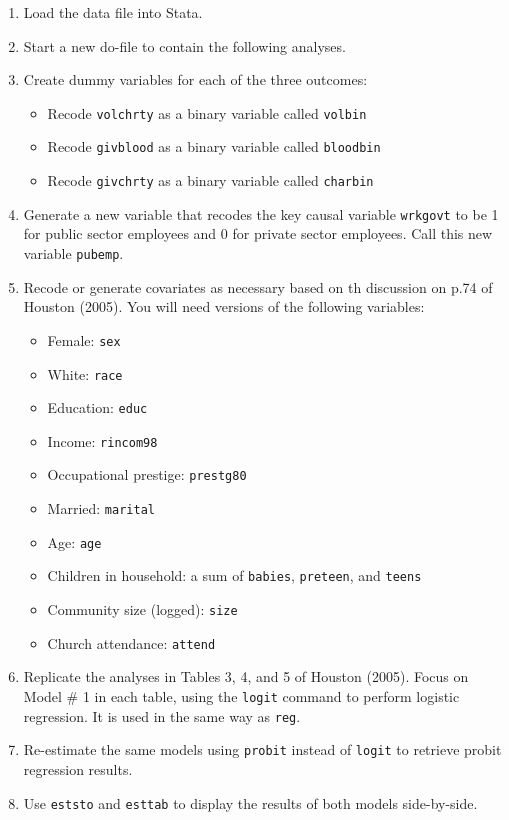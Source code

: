 \documentclass[a4paper,12pt]{article}
\begin{document}
\begin{enumerate}\itemsep1em
\item Load the data file into Stata.
\item Start a new do-file to contain the following analyses.
\item Create dummy variables for each of the three outcomes:
	\begin{itemize}
	\item Recode \texttt{volchrty} as a binary variable called \texttt{volbin} 
	\item Recode \texttt{givblood} as a binary variable called \texttt{bloodbin}
	\item Recode \texttt{givchrty} as a binary variable called \texttt{charbin}
	\end{itemize}
\item Generate a new variable that recodes the key causal variable \texttt{wrkgovt} to be 1 for public sector employees and 0 for private sector employees. Call this new variable \texttt{pubemp}.
\item Recode or generate covariates as necessary based on th discussion on p.74 of Houston (2005). You will need versions of the following variables:
	\begin{itemize}
	\item Female: \texttt{sex}
	\item White: \texttt{race}
	\item Education: \texttt{educ}
	\item Income: \texttt{rincom98}
	\item Occupational prestige: \texttt{prestg80}
	\item Married: \texttt{marital}
	\item Age: \texttt{age}
	\item Children in household: a sum of \texttt{babies}, \texttt{preteen}, and \texttt{teens}
	\item Community size (logged): \texttt{size}
	\item Church attendance: \texttt{attend}
	\end{itemize}
\item Replicate the analyses in Tables 3, 4, and 5 of Houston (2005). Focus on Model \# 1 in each table, using the \texttt{logit} command to perform logistic regression. It is used in the same way as \texttt{reg}.
\item Re-estimate the same models using \texttt{probit} instead of \texttt{logit} to retrieve probit regression results.
\item Use \texttt{eststo} and \texttt{esttab} to display the results of both models side-by-side.

\end{enumerate}
\end{document}
